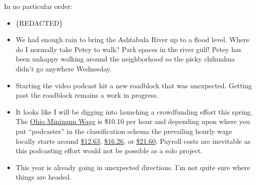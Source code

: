 In no particular order:

\begin{itemize}
\tightlist
\item
  \{REDACTED\}
\item
  We had enough rain to bring the Ashtabula River up to a flood level.
  Where do I normally take Petey to walk? Park spaces in the river gulf!
  Petey has been unhappy walking around the neighborhood so the picky
  chihuahua didn't go anywhere Wednesday.
\item
  Starting the video podcast hit a new roadblock that was unexpected.
  Getting past the roadblock remains a work in progress.
\item
  It looks like I will be digging into launching a crowdfunding effort
  this spring. The
  \href{https://com.ohio.gov/static/documents/2023MWPoster.pdf}{Ohio
  Minimum Wage} is \$10.10 per hour and depending upon where you put
  ``podcaster'' in the classification schema the prevailing hourly wage
  locally starts around
  \href{https://flcdatacenter.com/OesQuickResults.aspx?area=3900002&code=27-4012&year=23&source=1}{\$12.63},
  \href{https://flcdatacenter.com/OesQuickResults.aspx?area=3900002&code=27-2012&year=23&source=1}{\$16.26},
  or
  \href{https://flcdatacenter.com/OesQuickResults.aspx?area=3900002&code=15-1299&year=23&source=1}{\$21.60}.
  Payroll costs are inevitable as this podcasting effort would not be
  possible as a solo project.
\item
  This year is already going in unexpected directions. I'm not quite
  sure where things are headed.
\end{itemize}
